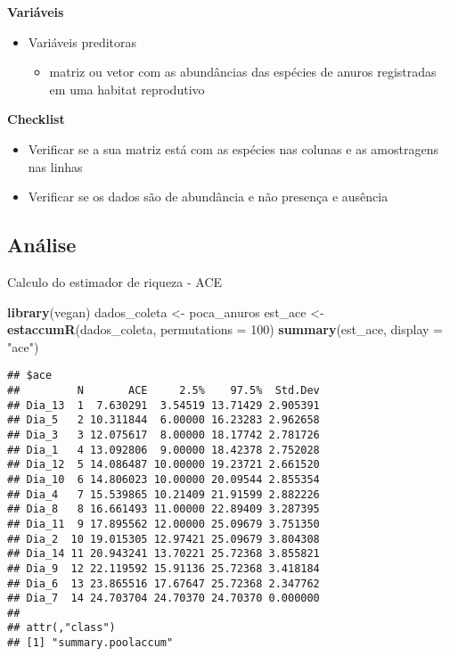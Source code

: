 \documentclass[
]{book}
\newenvironment{Shaded}{\begin{snugshade}}{\end{snugshade}}
\newcommand{\DataTypeTok}[1]{\textcolor[rgb]{0.13,0.29,0.53}{#1}}
\newcommand{\DecValTok}[1]{\textcolor[rgb]{0.00,0.00,0.81}{#1}}
\newcommand{\KeywordTok}[1]{\textcolor[rgb]{0.13,0.29,0.53}{\textbf{#1}}}
\newcommand{\NormalTok}[1]{#1}
\newcommand{\StringTok}[1]{\textcolor[rgb]{0.31,0.60,0.02}{#1}}
\providecommand{\tightlist}{%
  \setlength{\itemsep}{0pt}\setlength{\parskip}{0pt}}
\begin{document}
\textbf{Variáveis}

\begin{itemize}
\tightlist
\item
  Variáveis preditoras

  \begin{itemize}
  \tightlist
  \item
    matriz ou vetor com as abundâncias das espécies de anuros registradas em uma habitat reprodutivo
  \end{itemize}
\end{itemize}

\textbf{Checklist}

\begin{itemize}
\tightlist
\item
  Verificar se a sua matriz está com as espécies nas colunas e as amostragens nas linhas
\item
  Verificar se os dados são de abundância e não presença e ausência
\end{itemize}

\hypertarget{anuxe1lise-3}{%
\subsection{Análise}\label{anuxe1lise-3}}

Calculo do estimador de riqueza - ACE

\begin{Shaded}
\begin{Highlighting}[]
\KeywordTok{library}\NormalTok{(vegan)}
\NormalTok{dados_coleta <-}\StringTok{ }\NormalTok{poca_anuros}
\NormalTok{est_ace <-}\StringTok{ }\KeywordTok{estaccumR}\NormalTok{(dados_coleta, }\DataTypeTok{permutations =} \DecValTok{100}\NormalTok{)}
\KeywordTok{summary}\NormalTok{(est_ace, }\DataTypeTok{display =} \StringTok{"ace"}\NormalTok{)}
\end{Highlighting}
\end{Shaded}

\begin{verbatim}
## $ace
##         N       ACE     2.5%    97.5%  Std.Dev
## Dia_13  1  7.630291  3.54519 13.71429 2.905391
## Dia_5   2 10.311844  6.00000 16.23283 2.962658
## Dia_3   3 12.075617  8.00000 18.17742 2.781726
## Dia_1   4 13.092806  9.00000 18.42378 2.752028
## Dia_12  5 14.086487 10.00000 19.23721 2.661520
## Dia_10  6 14.806023 10.00000 20.09544 2.855354
## Dia_4   7 15.539865 10.21409 21.91599 2.882226
## Dia_8   8 16.661493 11.00000 22.89409 3.287395
## Dia_11  9 17.895562 12.00000 25.09679 3.751350
## Dia_2  10 19.015305 12.97421 25.09679 3.804308
## Dia_14 11 20.943241 13.70221 25.72368 3.855821
## Dia_9  12 22.119592 15.91136 25.72368 3.418184
## Dia_6  13 23.865516 17.67647 25.72368 2.347762
## Dia_7  14 24.703704 24.70370 24.70370 0.000000
## 
## attr(,"class")
## [1] "summary.poolaccum"
\end{verbatim}
\end{document}
